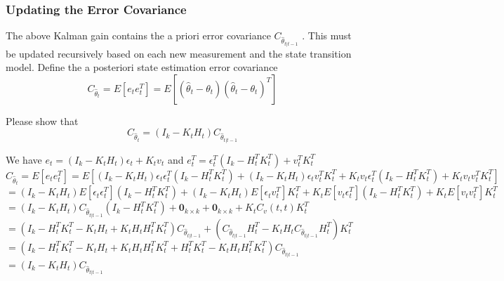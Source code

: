 \documentclass[a4 paper]{article}
\begin{document}
\subsubsection{Updating the Error Covariance } 
The above Kalman gain contains the a priori error covariance $C_{\hat{\theta}_{t|t-1}}$ . This must be updated recursively based on each new measurement and the state transition model. 
Define the a posteriori state estimation error covariance
\begin{equation}
    C_{\hat{\theta}_{t}}=E[e_{t}e_t^T]=E[(\hat{\theta}_{t}-\theta_t)(\hat{\theta}_{t}-\theta_t)^T]
\end{equation}
\begin{tcolorbox}[colback=RubineRed!5!white,colframe=RubineRed!75!black]
Please show that 
\begin{equation}
    C_{\hat{\theta}_{t}}=(I_k-K_tH_t)C_{\hat{\theta}_{t|t-1}}
\end{equation}
\end{tcolorbox}
\begin{tcolorbox}[colback=YellowGreen!5!white,colframe=YellowGreen!75!black,title={Problem 5's answer}]
    We have $e_t=(I_k-K_tH_t)\epsilon_t+K_tv_t$ and $e_t^T=\epsilon_t^T(I_k-H_t^TK_t^T)+v_t^TK_t^T$\newline
    $C_{\hat{\theta}_{t}}=E[e_te_t^T]=E[(I_k-K_tH_t)\epsilon_t\epsilon_t^T(I_k-H_t^TK_t^T)+(I_k-K_tH_t)\epsilon_tv_t^TK_t^T+K_tv_t\epsilon_t^T(I_k-H_t^TK_t^T)+K_tv_tv_t^TK_t^T]$\newline
    \hspace*{0.5cm}$=(I_k-K_tH_t)E[\epsilon_t\epsilon_t^T](I_k-H_t^TK_t^T)+(I_k-K_tH_t)E[\epsilon_tv_t^T]K_t^T+K_tE[v_t\epsilon_t^T](I_k-H_t^TK_t^T)+K_tE[v_tv_t^T]K_t^T$\newline
    \hspace*{0.5cm}$=(I_k-K_tH_t)C_{\hat{\theta}_{t|t-1}}(I_k-H_t^TK_t^T)+\textbf{0}_{k\times k}+\textbf{0}_{k\times k}+K_tC_v(t,t)K_t^T$\newline
    \hspace*{0.5cm}$=(I_k-H_t^TK_t^T-K_tH_t+K_tH_tH_t^TK_t^T)C_{\hat{\theta}_{t|t-1}}+(C_{\hat{\theta}_{t|t-1}}H_t^T-K_tH_tC_{\hat{\theta}_{t|t-1}}H^T_t)K_t^T$\newline
    \hspace*{0.5cm}$=(I_k-H_t^TK_t^T-K_tH_t+K_tH_tH_t^TK_t^T+H_t^TK_t^T-K_tH_tH^T_tK_t^T)C_{\hat{\theta}_{t|t-1}}$\newline
    \hspace*{0.5cm}$=(I_k-K_tH_t)C_{\hat{\theta}_{t|t-1}}$
\end{tcolorbox}
\end{document}
